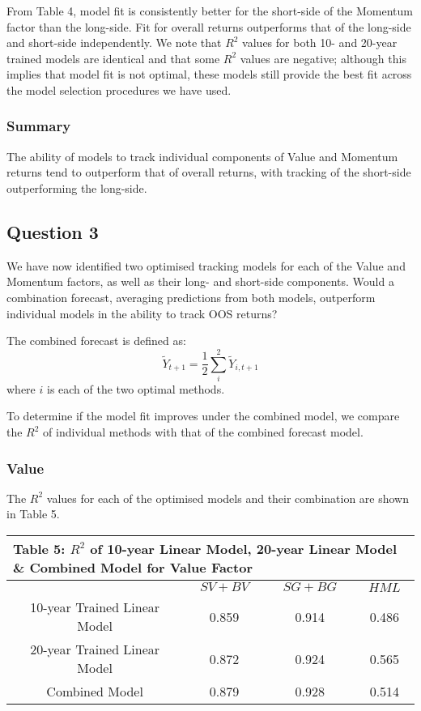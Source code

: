 \documentclass[AER]{AEA}
\begin{document}
\begin{spacing}{2}
From Table 4, model fit is consistently better for the short-side of the Momentum factor than the long-side. Fit for overall returns outperforms that of the long-side and short-side independently. We note that \(R^2\) values for both 10- and 20-year trained models are identical and that some \(R^2\) values are negative; although this implies that model fit is not optimal, these models still provide the best fit across the model selection procedures we have used.

\subsubsection{Summary}

The ability of models to track individual components of Value and Momentum returns tend to outperform that of overall returns, with tracking of the short-side outperforming the long-side.

\subsection{Question 3}

We have now identified two optimised tracking models for each of the Value and Momentum factors, as well as their long- and short-side components. Would a combination forecast, averaging predictions from both models, outperform individual models in the ability to track OOS returns?

The combined forecast is defined as:
\begin{equation}
    \tilde{Y}_{t+1}=\frac{1}{2}\sum_{i}^2\tilde{Y}_{i,t+1}
\end{equation}
where $i$ is each of the two optimal methods.

To determine if the model fit improves under the combined model, we compare the \(R^2\) of individual methods with that of the combined forecast model.

\subsubsection{Value}

The \(R^2\) values for each of the optimised models and their combination are shown in Table 5.

\begin{spacing}{1}
\begin{table}[H]
    \centering
    \begin{tabular}{|c|c|c|c|}
    \multicolumn{4}{l}{\textbf{Table 5: \(R^2\) of 10-year Linear Model, 20-year Linear Model \& Combined Model for Value Factor}}\\
    \hline
    & $SV+BV$ & $SG+BG$ & $HML$ \\
     \hline
    10-year Trained Linear Model & 0.859 & 0.914 & 0.486 \\
    \hline
    20-year Trained Linear Model & 0.872 & 0.924 & 0.565 \\
    \hline
    Combined Model & 0.879 & 0.928 & 0.514 \\
    \hline
    \end{tabular}
\end{table}
\end{spacing}


\end{spacing}
\end{document}
